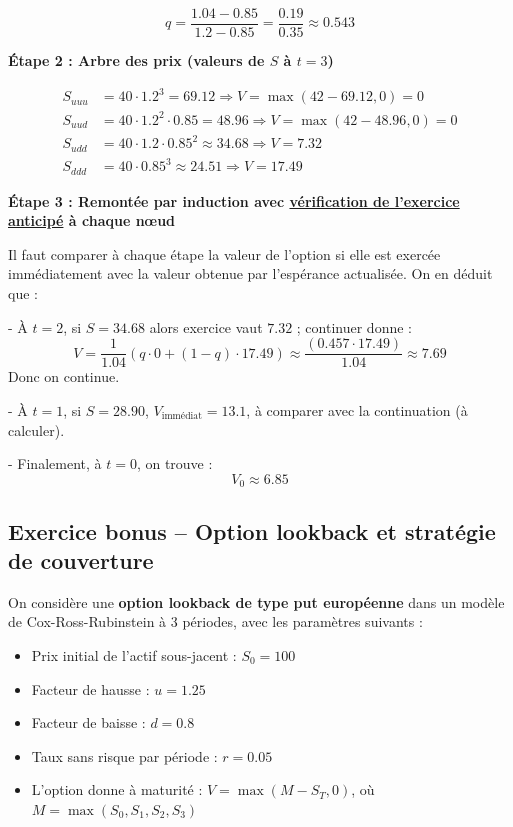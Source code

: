 \documentclass[12pt,a4paper]{article}
\begin{document}
\[
q = \frac{1.04 - 0.85}{1.2 - 0.85} = \frac{0.19}{0.35} \approx 0.543
\]

\textbf{Étape 2 : Arbre des prix (valeurs de $S$ à $t=3$)}

\[
\begin{aligned}
S_{uuu} &= 40 \cdot 1.2^3 = 69.12 \Rightarrow V = \max(42 - 69.12, 0) = 0 \\
S_{uud} &= 40 \cdot 1.2^2 \cdot 0.85 = 48.96 \Rightarrow V = \max(42 - 48.96, 0) = 0 \\
S_{udd} &= 40 \cdot 1.2 \cdot 0.85^2 \approx 34.68 \Rightarrow V = 7.32 \\
S_{ddd} &= 40 \cdot 0.85^3 \approx 24.51 \Rightarrow V = 17.49
\end{aligned}
\]

\textbf{Étape 3 : Remontée par induction avec \underline{vérification de l’exercice anticipé} à chaque nœud}

Il faut comparer à chaque étape la valeur de l’option si elle est exercée immédiatement avec la valeur obtenue par l’espérance actualisée. On en déduit que :

- À $t=2$, si $S=34.68$ alors exercice vaut $7.32$ ; continuer donne :
  \[
  V = \frac{1}{1.04}(q \cdot 0 + (1 - q) \cdot 17.49) \approx \frac{(0.457 \cdot 17.49)}{1.04} \approx 7.69
  \]
  Donc on continue.

- À $t=1$, si $S=28.90$, $V_\text{immédiat} = 13.1$, à comparer avec la continuation (à calculer).

- Finalement, à $t=0$, on trouve :
  \[
  V_0 \approx \boxed{6.85}
  \]

\subsection*{Exercice bonus -- Option lookback et stratégie de couverture}

On considère une \textbf{option lookback de type put européenne} dans un modèle de Cox-Ross-Rubinstein à 3 périodes, avec les paramètres suivants :

\begin{itemize}
    \item Prix initial de l’actif sous-jacent : $S_0 = 100$
    \item Facteur de hausse : $u = 1.25$
    \item Facteur de baisse : $d = 0.8$
    \item Taux sans risque par période : $r = 0.05$
    \item L'option donne à maturité : \( V = \max(M - S_T, 0) \), où \( M = \max(S_0, S_1, S_2, S_3) \)
\end{itemize}
\end{document}
